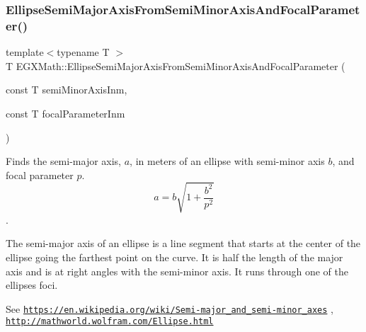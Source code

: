 \mbox{\label{group___e_g_x_math-_geometry-2_d-_ellipse-_semi_major_axis_ga8d8abd93ee6cdf43ba490874218f925f}} 
\subsubsection{\texorpdfstring{Ellipse\+Semi\+Major\+Axis\+From\+Semi\+Minor\+Axis\+And\+Focal\+Parameter()}{EllipseSemiMajorAxisFromSemiMinorAxisAndFocalParameter()}}
{\footnotesize\ttfamily template$<$typename T $>$ \\
T E\+G\+X\+Math\+::\+Ellipse\+Semi\+Major\+Axis\+From\+Semi\+Minor\+Axis\+And\+Focal\+Parameter (\begin{DoxyParamCaption}\item[{const T}]{semi\+Minor\+Axis\+Inm,  }\item[{const T}]{focal\+Parameter\+Inm }\end{DoxyParamCaption})}



Finds the semi-\/major axis, $a$, in meters of an ellipse with semi-\/minor axis $b$, and focal parameter $p$. \[ a=b\sqrt{1+\dfrac{b^2}{p^2}} \]. 

The semi-\/major axis of an ellipse is a line segment that starts at the center of the ellipse going the farthest point on the curve. It is half the length of the major axis and is at right angles with the semi-\/minor axis. It runs through one of the ellipses foci.

See \href{https://en.wikipedia.org/wiki/Semi-major_and_semi-minor_axes}{\tt https\+://en.\+wikipedia.\+org/wiki/\+Semi-\/major\+\_\+and\+\_\+semi-\/minor\+\_\+axes} , \href{http://mathworld.wolfram.com/Ellipse.html}{\tt http\+://mathworld.\+wolfram.\+com/\+Ellipse.\+html}


